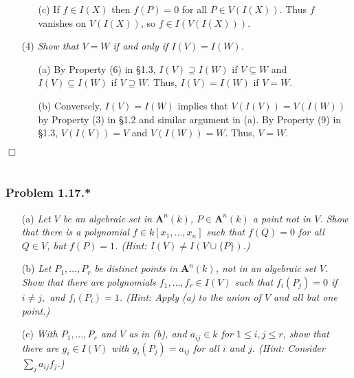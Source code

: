 \documentclass{article}
\begin{document}
\begin{enumerate}
\begin{enumerate}
  \item[(c)]
    If $f \in I(X)$ then $f(P) = 0$ for all $P \in V(I(X))$.
    Thus $f$ vanishes on $V(I(X))$, so $f \in I(V(I(X)))$.
  \end{enumerate}

\item[(4)]
  \emph{Show that $V = W$ if and only if $I(V) = I(W)$.}
  \begin{enumerate}
  \item[(a)]
    By Property (6) in \S 1.3, $I(V) \supseteq I(W)$ if $V \subseteq W$
    and $I(V) \subseteq I(W)$ if $V \supseteq W$.
    Thus, $I(V) = I(W)$ if $V = W$.

  \item[(b)]
    Conversely,
    $I(V) = I(W)$ implies that $V(I(V)) = V(I(W))$
    by Property (3) in \S 1.2 and similar argument in (a).
    By Property (9) in \S 1.3, $V(I(V)) = V$ and $V(I(W)) = W$.
    Thus, $V = W$.
  \end{enumerate}
\end{enumerate}
$\Box$ \\\\






\subsubsection*{Problem 1.17.*}
\begin{enumerate}
\item[(a)]
  \emph{Let $V$ be an algebraic set in $\mathbf{A}^n(k)$,
  $P \in\mathbf{A}^n(k)$ a point not in $V$.
  Show that there is a polynomial $f \in k[x_1,\ldots,x_n]$ such that $f(Q) = 0$
  for all $Q \in V$, but $f(P) = 1$. (Hint: $I(V) \neq I(V \cup \{P\})$.)}

\item[(b)]
  \emph{Let $P_1, \ldots, P_r$ be distinct points in $\mathbf{A}^n(k)$,
  not in an algebraic set $V$.
  Show that there are polynomials $f_1, \ldots, f_r \in I(V)$
  such that $f_i(P_j) = 0$ if $i \neq j,$ and $f_i(P_i) = 1$.
  (Hint: Apply (a) to the union of $V$ and all but one point.)}

\item[(c)]
  \emph{With $P_1, \ldots, P_r$ and $V$ as in (b),
  and $a_{ij} \in k$ for $1 \leq i,j \leq r$,
  show that there are $g_i \in I(V)$ with $g_i(P_j) = a_{ij}$ for all $i$ and $j$.
  (Hint: Consider $\sum_{j} a_{ij} f_j$.)} \\
\end{enumerate}
\end{document}
